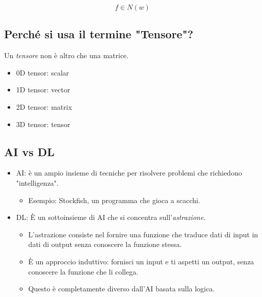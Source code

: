 $$ f \in N(w)$$

\subsection{Perché si usa il termine "Tensore"?}

Un \textit{tensore} non è altro che una matrice.
\begin{itemize}
  \item 0D tensor: scalar
  \item 1D tensor: vector
  \item 2D tensor: matrix
  \item 3D tensor: tensor
\end{itemize}

\subsection{AI vs DL}

\begin{itemize}
  \item AI: è un ampio insieme di tecniche per risolvere problemi che richiedono "intelligenza".
    \begin{itemize}
      \item Esempio: Stockfish, un programma che gioca a scacchi.
    \end{itemize}
  \item DL: È un sottoinsieme di AI che si concentra sull'\textit{astrazione}.
    \begin{itemize}
      \item L'astrazione consiste nel fornire una funzione che traduce dati di input in dati di output senza conoscere la funzione stessa.
      \item È un approccio induttivo: fornisci un input e ti aspetti un output, senza conoscere la funzione che li collega.
      \item Questo è completamente diverso dall'AI basata sulla logica.
    \end{itemize}
\end{itemize}
